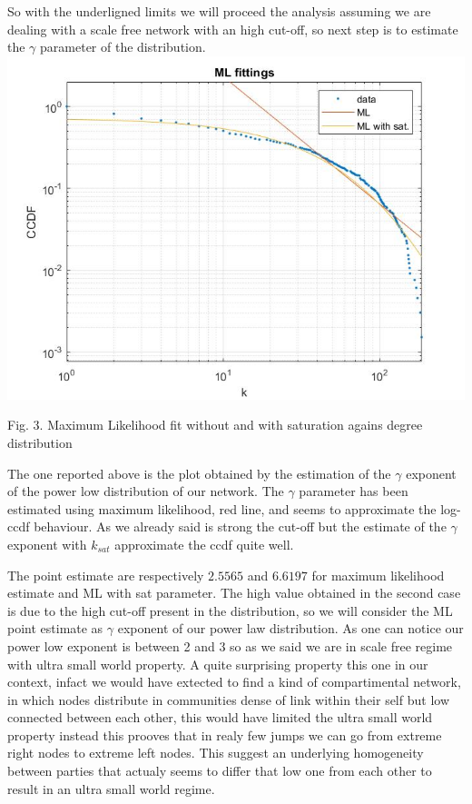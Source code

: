 \documentclass{article}%
\begin{document}
So with the underligned limits we will proceed the analysis assuming we are dealing with a scale free network with an high cut-off, so next step is to estimate the $\gamma$ parameter of the distribution.\\


\includegraphics[scale=0.5]{ML_fit}
\begin{center}
\begin{small}
Fig. 3. Maximum Likelihood fit without and with saturation agains degree distribution
\end{small}
\end{center}


The one reported above is the plot obtained by the estimation of the $\gamma$ exponent of the power low distribution of our network. The $\gamma$ parameter has been estimated using maximum likelihood, red line, and seems to approximate the log-ccdf behaviour. As we already said is strong the cut-off but the estimate of the $\gamma$ exponent with $k_{sat}$ approximate the ccdf quite well. 

The point estimate are respectively $2.5565$ and $6.6197$ for maximum likelihood estimate and ML with sat parameter. The high value obtained in the second case is due to the high cut-off present in the distribution, so we will consider the ML point estimate as $\gamma$ exponent of our power law distribution. 
As one can notice our power low exponent is between 2 and 3 so as we said we are in scale free regime with ultra small world property. A quite surprising property this one in our context, infact we would have extected to find a kind of compartimental network, in which nodes distribute in communities dense of link within their self but low connected between each other, this would have limited the ultra small world property instead this prooves that in realy few jumps we can go from extreme right nodes to extreme left nodes. This suggest an underlying homogeneity between parties that actualy seems to differ that low one from each other to result in an ultra small world regime.
\end{document}
